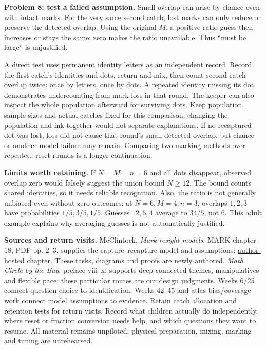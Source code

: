 \documentclass[letterpaper,11pt]{article}
\begin{document}
\textbf{Problem 8: test a failed assumption.} Small overlap can arise by chance even with intact marks. For the very same second catch, lost marks can only reduce or preserve the detected overlap. Using the original $M$, a positive ratio guess then increases or stays the same; zero makes the ratio unavailable. Thus ``must be large'' is unjustified.

A direct test uses permanent identity letters as an independent record. Record the first catch's identities and dots, return and mix, then count second-catch overlap twice: once by letters, once by dots. A repeated identity missing its dot demonstrates undercounting from mark loss in that round. The keeper can also inspect the whole population afterward for surviving dots. Keep population, sample sizes and actual catches fixed for this comparison; changing the population and ink together would not separate explanations. If no recaptured dot was lost, loss did not cause that round's small detected overlap, but chance or another model failure may remain. Comparing two marking methods over repeated, reset rounds is a longer continuation.

\textbf{Limits worth retaining.} If $N=M=n=6$ and all dots disappear, observed overlap zero would falsely suggest the union bound $N\ge12$. The bound counts shared identities, so it needs reliable recognition. Also, the ratio is not generally unbiased even without zero outcomes: at $N=6,M=4,n=3$, overlaps $1,2,3$ have probabilities $1/5,3/5,1/5$. Guesses $12,6,4$ average to $34/5$, not 6. This adult example explains why averaging guesses is not automatically justified.

\textbf{Sources and return visits.} McClintock, \emph{Mark-resight models}, MARK chapter 18, PDF pp. 2--3, supplies the capture--recapture model and assumptions: \href{https://sites.warnercnr.colostate.edu/gwhite/wp-content/uploads/sites/73/2017/05/MARK_resight_help.pdf}{author-hosted chapter}. These tasks, diagrams and proofs are newly authored. \emph{Math Circle by the Bay}, preface viii--x, supports deep connected themes, manipulatives and flexible pace; these particular routes are our design judgments. Weeks 6/25 connect question choice to identification; Weeks 42--45 and atlas bias/coverage work connect model assumptions to evidence. Retain catch allocation and retention tests for return visits. Record what children actually do independently, where reset or fraction conversion needs help, and which questions they want to resume. All material remains unpiloted; physical preparation, mixing, marking and timing are unrehearsed.
\end{document}
